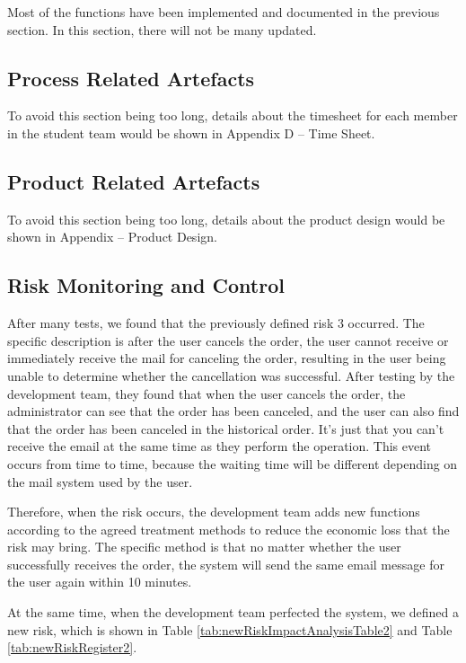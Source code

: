 Most of the functions have been implemented and documented in the previous section. In this section, there will not be many updated.

\subsection{Process Related Artefacts}
To avoid this section being too long, details about the timesheet for each member in the student team would be shown in Appendix D -- Time Sheet.

\subsection{Product Related Artefacts}
To avoid this section being too long, details about the product design would be shown in Appendix  -- Product Design.

\subsection{Risk Monitoring and Control}
After many tests, we found that the previously defined risk 3 occurred. The specific description is after the user cancels the order, the user cannot receive or immediately receive the mail for canceling the order, resulting in the user being unable to determine whether the cancellation was successful. After testing by the development team, they found that when the user cancels the order, the administrator can see that the order has been canceled, and the user can also find that the order has been canceled in the historical order. It's just that you can't receive the email at the same time as they perform the operation. This event occurs from time to time, because the waiting time will be different depending on the mail system used by the user.

Therefore, when the risk occurs, the development team adds new functions according to the agreed treatment methods to reduce the economic loss that the risk may bring. The specific method is that no matter whether the user successfully receives the order, the system will send the same email message for the user again within 10 minutes.

At the same time, when the development team perfected the system, we defined a new risk, which is shown in Table \ref{tab:newRiskImpactAnalysisTable2} and Table \ref{tab:newRiskRegister2}.

